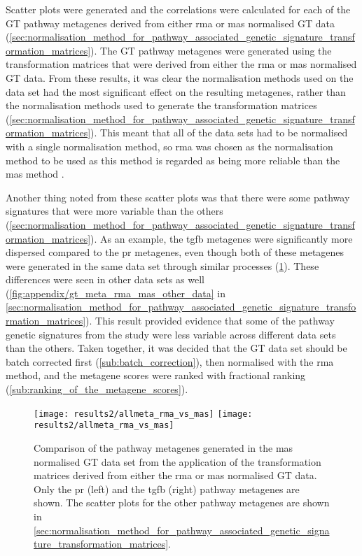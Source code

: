 Scatter plots were generated and the correlations were calculated for each of the GT pathway metagenes derived from either \gls{rma} or \gls{mas} normalised GT data (\cref{sec:normalisation_method_for_pathway_associated_genetic_signature_transformation_matrices}).
The GT pathway metagenes were generated using the transformation matrices that were derived from either the \gls{rma} or \gls{mas} normalised GT data.
From these results, it was clear the normalisation methods used on the data set had the most significant effect on the resulting metagenes, rather than the normalisation methods used to generate the transformation matrices (\cref{sec:normalisation_method_for_pathway_associated_genetic_signature_transformation_matrices}).
This meant that all of the data sets had to be normalised with a single normalisation method, so \gls{rma} was chosen as the normalisation method to be used as this method is regarded as being more reliable than the \gls{mas} method \citep{Irizarry2003}.

Another thing noted from these scatter plots was that there were some pathway signatures that were more variable than the others (\cref{sec:normalisation_method_for_pathway_associated_genetic_signature_transformation_matrices}).
As an example, the \gls{tgfb} metagenes were significantly more dispersed compared to the \gls{pr} metagenes, even though both of these metagenes were generated in the same data set through similar processes (\cref{fig:gt_rma_vs_mas}).
These differences were seen in other data sets as well (\cref{fig:appendix/gt_meta_rma_mas_other_data} in \cref{sec:normalisation_method_for_pathway_associated_genetic_signature_transformation_matrices}).
This result provided evidence that some of the pathway genetic signatures from the \citet{Gatza2010a} study were less variable across different data sets than the others.
Taken together, it was decided that the GT data set should be batch corrected first (\cref{sub:batch_correction}), then normalised with the \gls{rma} method, and the metagene scores were ranked with fractional ranking (\cref{sub:ranking_of_the_metagene_scores}).

\begin{figure}[htpb]
	\centering
	\texttt{[image: results2/allmeta\_rma\_vs\_mas]}
	\texttt{[image: results2/allmeta\_rma\_vs\_mas]}
	\caption[Comparison of the pathway metagenes generated in the \acrshort{mas} normalised GT data set from the application of TMs, derived from either the \acrshort{rma} or \acrshort{mas} normalised GT data]{Comparison of the pathway metagenes generated in the \acrshort{mas} normalised GT data set from the application of the transformation matrices derived from either the \acrshort{rma} or \acrshort{mas} normalised GT data.
	Only the \gls{pr} (left) and the \gls{tgfb}  (right) pathway metagenes are shown.
	The scatter plots for the other pathway metagenes are shown in \cref{sec:normalisation_method_for_pathway_associated_genetic_signature_transformation_matrices}.
	}
	\label{fig:gt_rma_vs_mas}
\end{figure}

